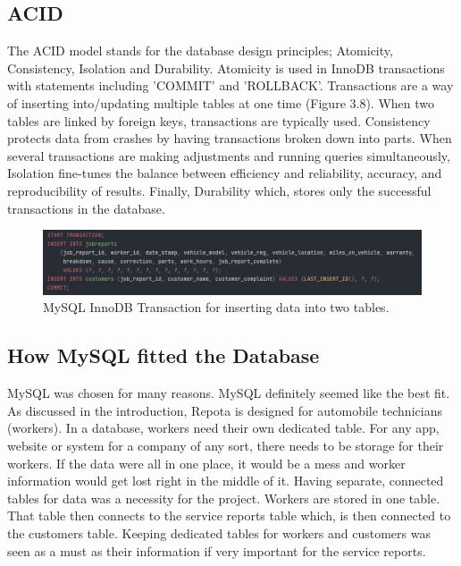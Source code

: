 \subsection{ACID}
The ACID model stands for the database design principles; Atomicity, Consistency, Isolation and Durability. Atomicity is used in InnoDB transactions with statements including 'COMMIT' and 'ROLLBACK'. Transactions are a way of inserting into/updating multiple tables at one time (Figure 3.8). When two tables are linked by foreign keys, transactions are typically used. Consistency protects data from crashes by having transactions broken down into parts. When several transactions are making adjustments and running queries simultaneously, Isolation fine-tunes the balance between efficiency and reliability, accuracy, and reproducibility of results. Finally, Durability which, stores only the successful transactions in the database. \cite{ref19}
 
 \begin{figure}[H]
    \caption{MySQL InnoDB Transaction for inserting data into two tables.}
    \label{image:transaction}
    \centering
    \includegraphics[width=1.0\textwidth]{images/misc/mysql-transation.png}
\end{figure}

\subsection{How MySQL fitted the Database}
MySQL was chosen for many reasons. MySQL definitely seemed like the best fit. As discussed in the introduction, Repota is designed for automobile technicians (workers). In a database, workers need their own dedicated table. For any app, website or system for a company of any sort, there needs to be storage for their workers. If the data were all in one place, it would be a mess and worker information would get lost right in the middle of it. Having separate, connected tables for data was a necessity for the project. Workers are stored in one table. That table then connects to the service reports table which, is then connected to the customers table. Keeping dedicated tables for workers and customers was seen as a must as their information if very important for the service reports.

